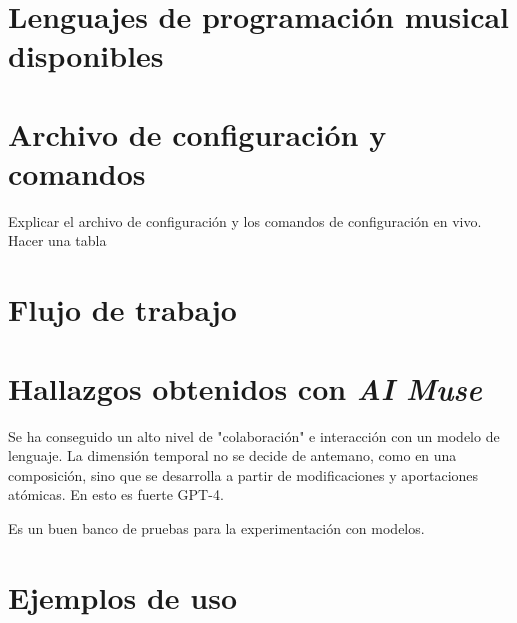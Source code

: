\section{Lenguajes de programación musical disponibles}

\section{Archivo de configuración y comandos}

Explicar el archivo de configuración y los comandos de configuración en vivo. Hacer una tabla

\section{Flujo de trabajo}

\section{Hallazgos obtenidos con \emph{AI Muse}}

Se ha conseguido un alto nivel de "colaboración" e interacción con un modelo de lenguaje. La dimensión temporal no se decide de antemano, como en una composición, sino que se desarrolla a partir de modificaciones y aportaciones atómicas. En esto es fuerte GPT-4.

Es un buen banco de pruebas para la experimentación con modelos. 



\section{Ejemplos de uso}